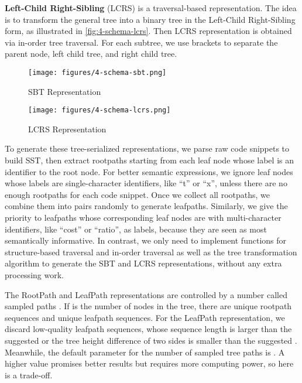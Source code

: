 \documentclass[conference]{IEEEtran}
\begin{document}
\textbf{Left-Child Right-Sibling} (LCRS) \cite{Chen2018TreetotreeNN} is a traversal-based representation. The idea is to transform the general tree into a binary tree in the Left-Child Right-Sibling form, as illustrated in \autoref{fig:4-schema-lcrs}. Then LCRS representation is obtained via in-order tree traversal. For each subtree, we use brackets to separate the parent node, left child tree, and right child tree.

\begin{figure}[!htb]
  \centering
  \texttt{[image: figures/4-schema-sbt.png]}
  \caption{SBT Representation}
  \label{fig:4-schema-sbt}
\end{figure}

\begin{figure}[!htb]
  \centering
  \texttt{[image: figures/4-schema-lcrs.png]}
  \caption{LCRS Representation}
  \label{fig:4-schema-lcrs}
\end{figure}

To generate these tree-serialized representations, we parse raw code snippets to build SST, then extract rootpaths starting from each leaf node whose label is an identifier to the root node. For better semantic expressions, we ignore leaf nodes whose labels are single-character identifiers, like ``t'' or ``x'', unless there are no enough rootpaths for each code snippet. Once we collect all rootpaths, we combine them into pairs randomly to generate leafpaths. Similarly, we give the priority to leafpaths whose corresponding leaf nodes are with multi-character identifiers, like ``cost'' or ``ratio'', as labels, because they are seen as most semantically informative. In contrast, we only need to implement functions for structure-based traversal and in-order traversal as well as the tree transformation algorithm to generate the SBT and LCRS representations, without any extra processing work.

The RootPath and LeafPath representations are controlled by a number called sampled paths . If  is the number of nodes in the tree, there are  unique rootpath sequences and  unique leafpath sequences.
For the LeafPath representation, we discard low-quality leafpath sequences, whose sequence length is larger than the suggested  or the tree height difference of two sides is smaller than the suggested  \cite{Alon2018code2vecLD,Alon2018code2seqGS}. Meanwhile, the default parameter for the number of sampled tree paths is . A higher value promises better results but requires more computing power, so here is a trade-off.
\end{document}
